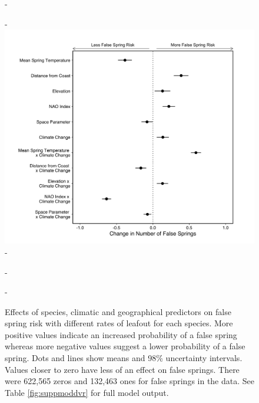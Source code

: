 \documentclass{article}\usepackage[]{graphicx}\usepackage[]{color}
\begin{document}
  {\begin{figure} [H]
  -\begin{center}
  -\includegraphics[width=12cm]{..//analyses/figures/model_output_98_dvr.png}
  -\caption{Effects of species, climatic and geographical predictors on false spring risk with different rates of leafout for each species. More positive values indicate an increased probability of a false spring whereas more negative values suggest a lower probability of a false spring. Dots and lines show means and 98\% uncertainty intervals. Values closer to zero have less of an effect on false springs. There were 622,565 zeros and 132,463 ones for false springs in the data. See Table \ref{fig:suppmoddvr} for full model output. }\label{fig:dvr}
  -\end{center}
  -\end{figure}}
  
\end{document}
